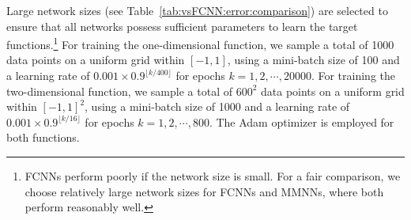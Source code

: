 \documentclass[review,hidelinks,onefignum,onetabnum]{siamart250211}
\begin{document}


Large network sizes (see Table~\ref{tab:vsFCNN:error:comparison}) are selected to ensure that all networks possess sufficient parameters to learn the target functions.\footnote{FCNNs perform poorly if the network size is small. For a fair comparison, we choose relatively large network sizes for FCNNs and MMNNs, where both perform reasonably well.
}
For training the one-dimensional function, we sample a total of 1000 data points on a uniform grid within \([-1,1]\), using a mini-batch size of 100 and a learning rate of \(0.001 \times 0.9^{\lfloor k/400 \rfloor}\) for epochs \(k = 1, 2, \cdots, 20000\).
For training the two-dimensional function, we sample a total of \(600^2\) data points on a uniform grid within \([-1,1]^2\), using a mini-batch size of 1000 and a learning rate of \(0.001 \times 0.9^{\lfloor k/16 \rfloor}\) for epochs \(k = 1, 2, \cdots, 800\).  
The Adam optimizer is employed for both functions.
\end{document}
